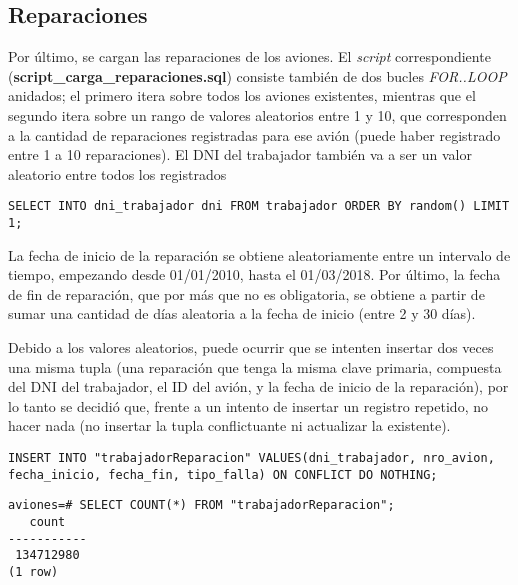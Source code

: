 \subsection{Reparaciones}
Por último, se cargan las reparaciones de los aviones. El \emph{script} correspondiente (\textbf{script\_carga\_reparaciones.sql}) consiste también de dos bucles \emph{FOR..LOOP} anidados; el primero itera sobre todos los aviones existentes, mientras que el segundo itera sobre un rango de valores aleatorios entre 1 y 10, que corresponden a la cantidad de reparaciones registradas para ese avión (puede haber registrado entre 1 a 10 reparaciones). El DNI del trabajador también va a ser un valor aleatorio entre todos los registrados
\vspace*{5mm}
\lstset{style=sql}
\begin{lstlisting}
SELECT INTO dni_trabajador dni FROM trabajador ORDER BY random() LIMIT 1;
\end{lstlisting}

La fecha de inicio de la reparación se obtiene aleatoriamente entre un intervalo de tiempo, empezando desde 01/01/2010, hasta el 01/03/2018. Por último, la fecha de fin de reparación, que por más que no es obligatoria, se obtiene a partir de sumar una cantidad de días aleatoria a la fecha de inicio (entre 2 y 30 días).

Debido a los valores aleatorios, puede ocurrir que se intenten insertar dos veces una misma tupla (una reparación que tenga la misma clave primaria, compuesta del DNI del trabajador, el ID del avión, y la fecha de inicio de la reparación), por lo tanto se decidió que, frente a un intento de insertar un registro repetido, no hacer nada (no insertar la tupla conflictuante ni actualizar la existente).

\vspace*{5mm}
\lstset{style=sql}
\begin{lstlisting}
INSERT INTO "trabajadorReparacion" VALUES(dni_trabajador, nro_avion, fecha_inicio, fecha_fin, tipo_falla) ON CONFLICT DO NOTHING;
\end{lstlisting}

\lstset{style=sql}
\begin{lstlisting}
aviones=# SELECT COUNT(*) FROM "trabajadorReparacion";
   count   
-----------
 134712980
(1 row)
\end{lstlisting}







\clearpage




